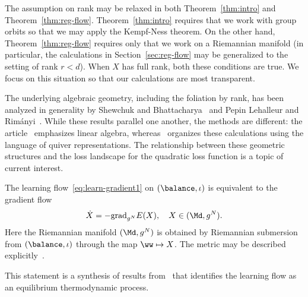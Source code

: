 \begin{remark}
\label{rem:low-rank-scaling}
The assumption on rank may be relaxed in both Theorem~\ref{thm:intro} and Theorem~\ref{thm:reg-flow}. Theorem~\ref{thm:intro} requires that we work with group orbits so that we may apply the Kempf-Ness theorem. On the other hand, Theorem~\ref{thm:reg-flow} requires only that we work on a Riemannian manifold (in particular, the calculations in Section~\ref{sec:reg-flow} may be generalized to the setting of rank $r<d$). When $X$ has full rank, both these conditions are true. We focus on this situation so that our calculations are most transparent.

The underlying algebraic geometry, including the foliation by rank, has been analyzed in generality by Shewchuk and Bhattacharya~\cite{Shewchuk} and Pepin Lehalleur and Rim\'{a}nyi~\cite{Lehalleur}. While these results parallel one another, the methods are different: the article~\cite{Shewchuk} emphasizes linear algebra, whereas~\cite{Lehalleur} organizes these calculations using the language of quiver representations. The relationship between these geometric structures and the loss landscape for the quadratic loss function is a topic of current interest.
\end{remark}



\begin{remark}
\label{rem:learn-flow}
The learning flow~\eqref{eq:learn-gradient1} on $(\balance,\iota)$ is equivalent to the gradient flow
\begin{equation}
    \label{eq:learning-flow} \dot{X} = - \mathrm{grad}_{g^N} E(X), \quad X \in (\Md,g^N).
\end{equation}
Here the Riemannian manifold $(\Md,g^N)$ is obtained by Riemannian submersion from $(\balance,\iota)$ through the map $\ww \mapsto X$. The metric may be described explicitly~\cite{GM-dln}.

This statement is a synthesis of results from~\cite{ACH,Bah,MY-dln,MY-RLE} that identifies the learning flow as an equilibrium thermodynamic  process.
\end{remark}

